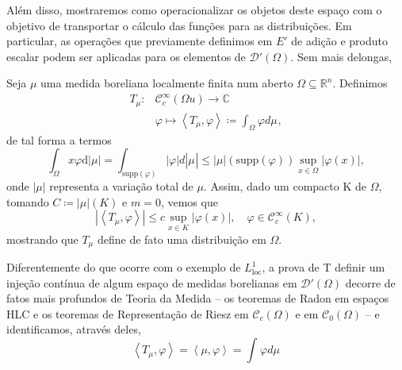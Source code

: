\documentclass[../distribution_theory_notes.tex]{subfiles}
\begin{document}
Além disso, mostraremos como operacionalizar os objetos deste espaço com o objetivo de transportar o cálculo das funções para as distribuições. Em particular, as operações que previamente definimos em \(E'\) de adição e produto escalar podem ser aplicadas para os elementos de \(\mathcal{D}'(\Omega )\). Sem mais delongas, 
\begin{example}
  Seja \(\mu \) uma medida boreliana localmente finita num aberto \(\Omega \subseteq \mathbb{R}^{n}.\) Definimos 
 \begin{align*}
     T_{\mu }:&\mathcal{C}_{c}^{\infty}(\Omega u)\rightarrow \mathbb{C} \\
        &\varphi \longmapsto \left< T_{\mu }, \varphi  \right> \coloneqq \int_{\Omega }\varphi  d\mu_{},
 \end{align*}
 de tal forma a termos 
   \[
     \int_{\Omega }^{}x \varphi  \mathrm{d}| \mu  | = \int_{\mathrm{supp}(\varphi )}| \varphi  | d| \mu_{} | \leq | \mu   |(\mathrm{supp}(\varphi ))\sup_{x\in \Omega }| \varphi (x) |,
   \]
   onde \(| \mu  |\) representa a variação total de \(\mu .\) Assim, dado um compacto K de \(\Omega \), tomando \(C\coloneqq | \mu  |(K)\) e \(m=0\), vemos que 
     \[
       |\left< T_{\mu }, \varphi  \right>  | \leq c\sup_{x\in K}| \varphi (x) |,\quad \varphi \in \mathcal{C}_{c}^{\infty}(K),
     \]
     mostrando que \(T_{\mu }\) define de fato uma distribuição em \(\Omega.\)
\end{example}
  \begin{tcolorbox}[
  skin=enhanced,
  title=Observação,
  fonttitle=\bfseries,
colframe=black,
  colbacktitle=cyan!75!white, 
  colback=cyan!15,
  colbacklower=black,
coltitle=black,
  drop fuzzy shadow,
  ]
  Diferentemente do que ocorre com o exemplo de \(L_{\mathrm{loc}}^{1}\), a prova de T definir um injeção contínua de algum espaço de medidas borelianas em \(\mathcal{D}'(\Omega )\) decorre de fatos mais profundos de Teoria da Medida -- os teoremas de Radon em espaços HLC e os teoremas de Representação de Riesz em \(\mathcal{C}_{c}^{}(\Omega )\) e em \(\mathcal{C}_{0}(\Omega )\) -- e identificamos, através deles, 
    \[
      \left< T_{\mu }, \varphi  \right> = \left< \mu , \varphi  \right> = \int_{}\varphi  d\mu_{}
    \]
  \end{tcolorbox}
\end{document}
